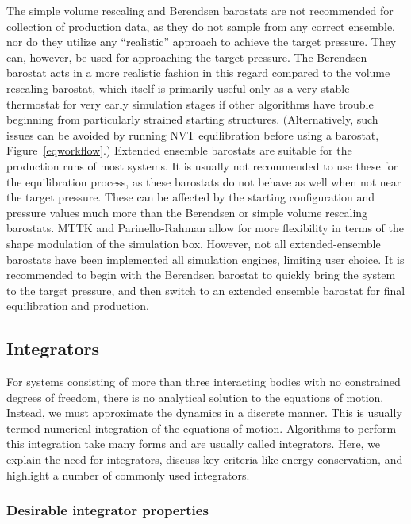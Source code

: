 \documentclass[9pt,bestpractices]{livecoms}
\begin{document}
The simple volume rescaling and Berendsen barostats are not recommended for collection of production data, as they do not sample from any correct ensemble, nor do they utilize any ``realistic'' approach to achieve the target pressure.
They can, however,  be used for approaching the target pressure.
The Berendsen barostat acts in a more realistic fashion in this regard compared to the volume rescaling barostat, which itself is primarily useful only as a very stable thermostat for very early simulation stages if other algorithms have trouble beginning from particularly strained starting structures.
(Alternatively, such issues can be avoided by running NVT equilibration before using a barostat, Figure~\ref{eqworkflow}.)
Extended ensemble barostats are suitable for the production runs of most systems.
It is usually not recommended to use these for the equilibration process, as these barostats do not behave as well when not near the target pressure.
These can be affected by the starting configuration and pressure values much more than the Berendsen or simple volume rescaling barostats.
MTTK and Parinello-Rahman allow for more flexibility in terms of the shape modulation of the simulation box.
However, not all extended-ensemble barostats have been implemented all simulation engines, limiting user choice.
It is recommended to begin with the Berendsen barostat to quickly bring the system to the target pressure, and then switch to an extended ensemble barostat for final equilibration and production.

\subsection{Integrators}
\label{sec:integrators}

For systems consisting of more than three interacting bodies with no constrained degrees of freedom, there is no analytical solution to the equations of motion.
Instead, we must approximate the dynamics in a discrete manner.
This is usually termed numerical integration of the equations of motion.
Algorithms to perform this integration take many forms and are usually called integrators.
Here, we explain the need for integrators, discuss key criteria like energy conservation, and highlight a number of commonly used integrators.

\subsubsection{Desirable integrator properties}
\end{document}
